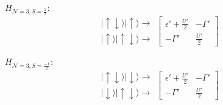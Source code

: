 \begin{multicols}{2}

$H_{\mathcal{N}=3,S=\frac{1}{2}}:$
\[
\begin{array}{c}
\vert\uparrow\!\downarrow\rangle\vert\uparrow\rangle\rightarrow\\
\vert\uparrow\rangle\vert\uparrow\!\downarrow\rangle\rightarrow
\end{array}\left[\begin{array}{cc}
\epsilon'+\frac{U'}{2} & -\Gamma'\\
-\Gamma' & \frac{U'}{2}
\end{array}\right]
\]


$H_{\mathcal{N}=3,S=\frac{-1}{2}}:$
\[
\begin{array}{c}
\vert\uparrow\!\downarrow\rangle\vert\downarrow\rangle\rightarrow\\
\vert\downarrow\rangle\vert\uparrow\!\downarrow\rangle\rightarrow
\end{array}\left[\begin{array}{cc}
\epsilon'+\frac{U'}{2} & -\Gamma'\\
-\Gamma' & \frac{U'}{2}
\end{array}\right]
\]


\end{multicols}

